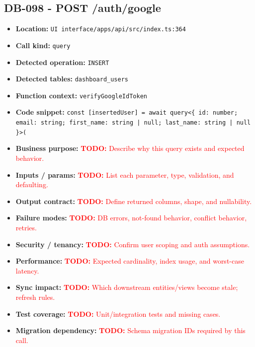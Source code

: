 \documentclass[11pt]{article}
\newcommand{\todoitem}[1]{\textcolor{red}{\textbf{TODO:} #1}}
\begin{document}
\subsection{DB-098 - POST /auth/google}
\begin{itemize}[leftmargin=1.5em]
\item \textbf{Location:} \texttt{UI interface/apps/api/src/index.ts:364}
\item \textbf{Call kind:} \texttt{query}
\item \textbf{Detected operation:} \texttt{INSERT}
\item \textbf{Detected tables:} \texttt{dashboard\_users}
\item \textbf{Function context:} \texttt{verifyGoogleIdToken}
\item \textbf{Code snippet:} \texttt{const [insertedUser] = await query<\{ id: number; email: string; first\_name: string | null; last\_name: string | null \}>(}
\item \textbf{Business purpose:} \todoitem{Describe why this query exists and expected behavior.}
\item \textbf{Inputs / params:} \todoitem{List each parameter, type, validation, and defaulting.}
\item \textbf{Output contract:} \todoitem{Define returned columns, shape, and nullability.}
\item \textbf{Failure modes:} \todoitem{DB errors, not-found behavior, conflict behavior, retries.}
\item \textbf{Security / tenancy:} \todoitem{Confirm user scoping and auth assumptions.}
\item \textbf{Performance:} \todoitem{Expected cardinality, index usage, and worst-case latency.}
\item \textbf{Sync impact:} \todoitem{Which downstream entities/views become stale; refresh rules.}
\item \textbf{Test coverage:} \todoitem{Unit/integration tests and missing cases.}
\item \textbf{Migration dependency:} \todoitem{Schema migration IDs required by this call.}
\end{itemize}
\end{document}
